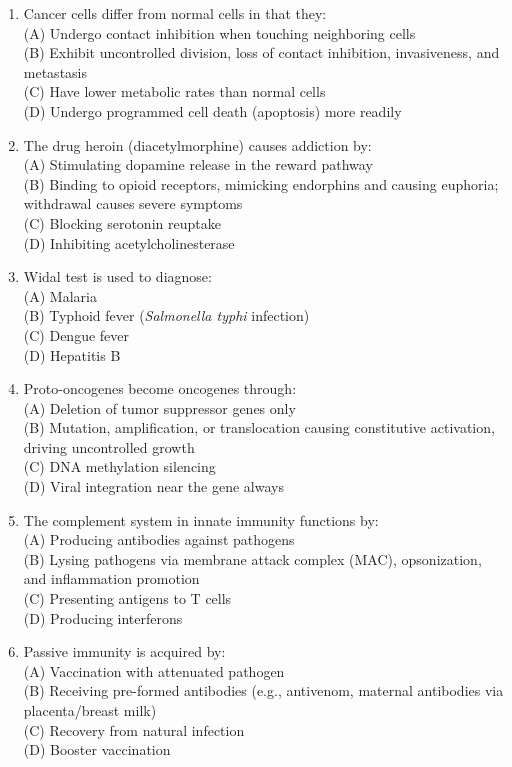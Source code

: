 \documentclass{article}
\begin{document}
\begin{enumerate}[label=Q\arabic*.]
\item Cancer cells differ from normal cells in that they:
\\(A) Undergo contact inhibition when touching neighboring cells
\\(B) Exhibit uncontrolled division, loss of contact inhibition, invasiveness, and metastasis
\\(C) Have lower metabolic rates than normal cells
\\(D) Undergo programmed cell death (apoptosis) more readily

\item The drug heroin (diacetylmorphine) causes addiction by:
\\(A) Stimulating dopamine release in the reward pathway
\\(B) Binding to opioid receptors, mimicking endorphins and causing euphoria; withdrawal causes severe symptoms
\\(C) Blocking serotonin reuptake
\\(D) Inhibiting acetylcholinesterase

\item Widal test is used to diagnose:
\\(A) Malaria
\\(B) Typhoid fever (\textit{Salmonella typhi} infection)
\\(C) Dengue fever
\\(D) Hepatitis B

\item Proto-oncogenes become oncogenes through:
\\(A) Deletion of tumor suppressor genes only
\\(B) Mutation, amplification, or translocation causing constitutive activation, driving uncontrolled growth
\\(C) DNA methylation silencing
\\(D) Viral integration near the gene always

\item The complement system in innate immunity functions by:
\\(A) Producing antibodies against pathogens
\\(B) Lysing pathogens via membrane attack complex (MAC), opsonization, and inflammation promotion
\\(C) Presenting antigens to T cells
\\(D) Producing interferons

\item Passive immunity is acquired by:
\\(A) Vaccination with attenuated pathogen
\\(B) Receiving pre-formed antibodies (e.g., antivenom, maternal antibodies via placenta/breast milk)
\\(C) Recovery from natural infection
\\(D) Booster vaccination


\end{enumerate}
\end{document}
